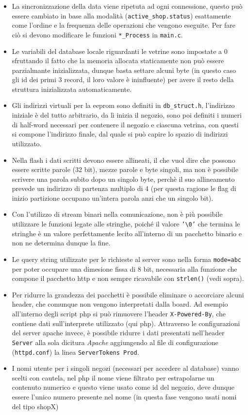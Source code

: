 \begin{itemize}
\item La sincronizzazione della data viene ripetuta ad ogni connessione, questo pu\`o essere cambiato in base alla modalit\`a (\texttt{active\_shop.status}) esattamente come l'ordine e la frequenza delle operazioni che vengono eseguite. Per fare ci\`o si devono modificare le funzioni \texttt{*\_Process} in \texttt{main.c}.
\item Le variabili del database locale riguardanti le vetrine sono impostate a 0 sfruttando il fatto che la memoria allocata staticamente non pu\`o essere parzialmante inizializzata, dunque basta settare alcuni byte (in questo caso gli id dei primi 3 record, il loro valore \`e ininfluente) per avere il resto della struttura inizializzata automaticamente.
\item Gli indirizzi virtuali per la eeprom sono definiti in \texttt{db\_struct.h}, l'indirizzo iniziale \`e del tutto arbitrario, da l\`i inizia il negozio, sono poi definiti i numeri di half-word necessari per contenere il negozio e ciascuna vetrina, con questi si compone l'indirizzo finale, dal quale si pu\`o capire lo spazio di indirizzi utilizzato.
\item Nella flash i dati scritti devono essere allineati, il che vuol dire che possono essere scritte parole (32 bit), mezze parole e byte singoli, ma non \`e possibile scrivere una parola subito dopo un singolo byte, perch\`e il suo allineamento prevede un indirizzo di partenza multiplo di 4 (per questa ragione le flag di inizio partizione occupano un'intera parola anzi che un singolo bit).
\item Con l'utilizzo di stream binari nella comunicazione, non \`e pi\`u possibile utilizzare le funzioni legate alle stringhe, poich\'e il valore \texttt{'\textbackslash 0'} che termina le stringhe \`e un valore perfettamente lecito all'interno di un pacchetto binario e non ne determina dunque la fine.
\item Le query string utilizzate per le richieste al server sono nella forma \texttt{mode=abc} per poter occupare una dimesione fissa di 8 bit, necessaria alla funzione che compone il pacchetto http e non sempre ricavabile con \texttt{strlen()} (vedi sopra).
\item Per ridurre la grandezza dei pacchetti \`e possibile eliminare o accorciare alcuni header, che comunque non vengono interpretati dalla board. Ad esempio all'interno degli script php si pu\`o rimuovere l'header \texttt{X-Powered-By}, che contiene dati sull'interprete utilizzato (qui php). Attraverso le configurazioni del server apache invece, \`e possibile ridurre i dati presentati nell'header \texttt{Server} alla sola dicitura \textit{Apache} aggiungendo al file di configurazione (\texttt{httpd.conf}) la linea \texttt{ServerTokens Prod}.
\item I nomi utente per i singoli negozi (necessari per accedere al database) vanno scelti con cautela, nel php il nome viene filtrato per estrapolarne un contenuto numerico e questo viene usato come id del negozio, deve dunque essere l'unico numero presente nel nome (in questa fase vengono usati nomi del tipo shopX)
\end{itemize}
